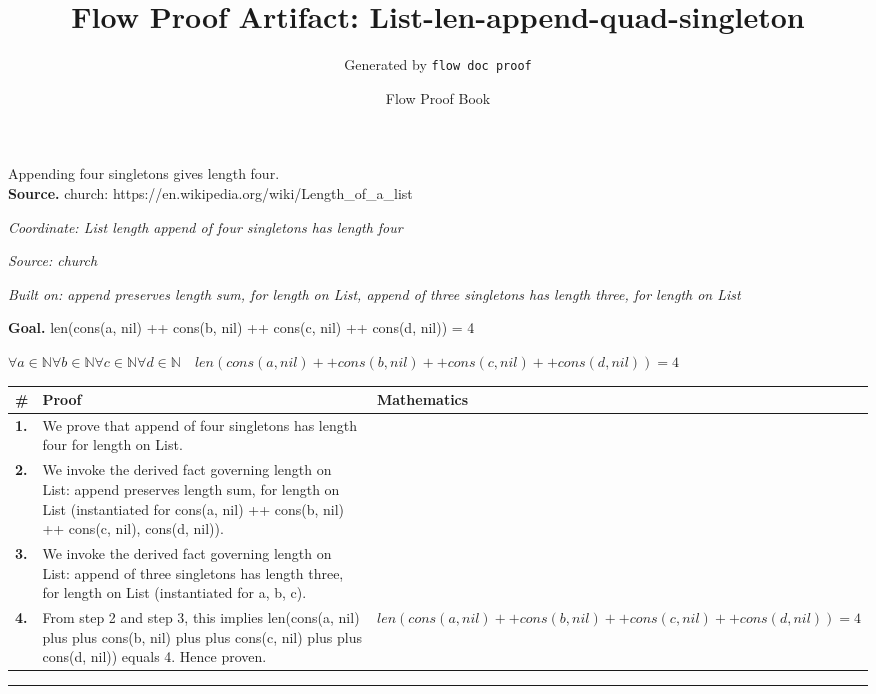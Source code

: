 \documentclass[11pt]{article}
\title{Flow Proof Artifact: List-len-append-quad-singleton}
\author{Generated by \texttt{flow doc proof}}
\date{Flow Proof Book}
\theoremstyle{definition}
\begin{document}
\maketitle
Appending four singletons gives length four.\\[0.5em]
\textbf{Source.} church: https://en.wikipedia.org/wiki/Length\_of\_a\_list\\[0.5em]
\bigskip
{}\par
\smallskip\noindent\textit{Coordinate: List \cdot length \cdot append of four singletons has length four}\par
\smallskip\noindent\textit{Source: church}\par
\smallskip\noindent\textit{Built on: append preserves length sum, for length on List, append of three singletons has length three, for length on List}\par
\medskip
\noindent\textbf{Goal.} len(cons(a, nil) ++ cons(b, nil) ++ cons(c, nil) ++ cons(d, nil)) = 4\par
\noindent$\displaystyle \forall a \in \mathbb{N} \forall b \in \mathbb{N} \forall c \in \mathbb{N} \forall d \in \mathbb{N}\quad len(cons(a, nil) ++ cons(b, nil) ++ cons(c, nil) ++ cons(d, nil)) = 4$\par
\medskip
\noindent
\begin{tabular}{@{} >{\raggedright\arraybackslash}p{} >{\raggedright\arraybackslash}p{} >{\raggedleft\arraybackslash}p{} @{}}
\textbf{\#} & \textbf{Proof} & \textbf{Mathematics} \\
\midrule
\textbf{1.} & We prove that append of four singletons has length four for length on List. & \\[0.45em]
\textbf{2.} & We invoke the derived fact governing length on List: append preserves length sum, for length on List (instantiated for cons(a, nil) ++ cons(b, nil) ++ cons(c, nil), cons(d, nil)). & \\[0.45em]
\textbf{3.} & We invoke the derived fact governing length on List: append of three singletons has length three, for length on List (instantiated for a, b, c). & \\[0.45em]
\textbf{4.} & From step 2 and step 3, this implies len(cons(a, nil) plus plus cons(b, nil) plus plus cons(c, nil) plus plus cons(d, nil)) equals 4. Hence proven. & $\displaystyle len(cons(a, nil) ++ cons(b, nil) ++ cons(c, nil) ++ cons(d, nil)) = 4$ \\[0.45em]
\bottomrule
\end{tabular}
\label{thm:List-length-append_of_four_singletons_has_length_four}
\par\medskip\hrule
\end{document}
